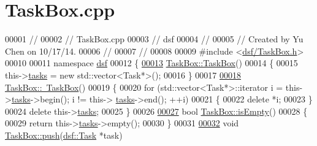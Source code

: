 \hypertarget{_task_box_8cpp_source}{}\section{Task\+Box.\+cpp}
\label{_task_box_8cpp_source}

\begin{DoxyCode}
00001 \textcolor{comment}{//}
00002 \textcolor{comment}{//  TaskBox.cpp}
00003 \textcolor{comment}{//  dsf}
00004 \textcolor{comment}{//}
00005 \textcolor{comment}{//  Created by Yu Chen on 10/17/14.}
00006 \textcolor{comment}{//}
00007 \textcolor{comment}{//}
00008 
00009 \textcolor{preprocessor}{#include <\hyperlink{_task_box_8h}{dsf/TaskBox.h}>}
00010 
00011 \textcolor{keyword}{namespace }\hyperlink{namespacedsf}{dsf}
00012 \{
\hypertarget{_task_box_8cpp_source_l00013}{}\hyperlink{classdsf_1_1_task_box_a931c925e0a4956ee6bc1674f43ecc0a0}{00013}     \hyperlink{classdsf_1_1_task_box_a931c925e0a4956ee6bc1674f43ecc0a0}{TaskBox::TaskBox}()
00014     \{
00015         this->\hyperlink{classdsf_1_1_task_box_ae13d0d245cacbf7f4019f7ff5486aa79}{tasks} = \textcolor{keyword}{new} std::vector<Task*>();
00016     \}
00017     
\hypertarget{_task_box_8cpp_source_l00018}{}\hyperlink{classdsf_1_1_task_box_a3445ee5ebd0141d317d8fe0a00b07d1c}{00018}     \hyperlink{classdsf_1_1_task_box_a3445ee5ebd0141d317d8fe0a00b07d1c}{TaskBox::~TaskBox}()
00019     \{
00020         \textcolor{keywordflow}{for} (std::vector<Task*>::iterator i = this->\hyperlink{classdsf_1_1_task_box_ae13d0d245cacbf7f4019f7ff5486aa79}{tasks}->begin(); i != this->
      \hyperlink{classdsf_1_1_task_box_ae13d0d245cacbf7f4019f7ff5486aa79}{tasks}->end(); ++i)
00021         \{
00022             \textcolor{keyword}{delete} *i;
00023         \}
00024         \textcolor{keyword}{delete} this->\hyperlink{classdsf_1_1_task_box_ae13d0d245cacbf7f4019f7ff5486aa79}{tasks};
00025     \}
00026     
\hypertarget{_task_box_8cpp_source_l00027}{}\hyperlink{classdsf_1_1_task_box_a7e67fd9b7104d24cb4be54f6a48eb8c9}{00027}     \textcolor{keywordtype}{bool} \hyperlink{classdsf_1_1_task_box_a7e67fd9b7104d24cb4be54f6a48eb8c9}{TaskBox::isEmpty}()
00028     \{
00029         \textcolor{keywordflow}{return} this->\hyperlink{classdsf_1_1_task_box_ae13d0d245cacbf7f4019f7ff5486aa79}{tasks}->empty();
00030     \}
00031     
\hypertarget{_task_box_8cpp_source_l00032}{}\hyperlink{classdsf_1_1_task_box_a0ec4e52a625fae00e05b072d6434eef1}{00032}     \textcolor{keywordtype}{void} \hyperlink{classdsf_1_1_task_box_a0ec4e52a625fae00e05b072d6434eef1}{TaskBox::push}(\hyperlink{classdsf_1_1_task}{dsf::Task} *task)

\end{DoxyCode}
